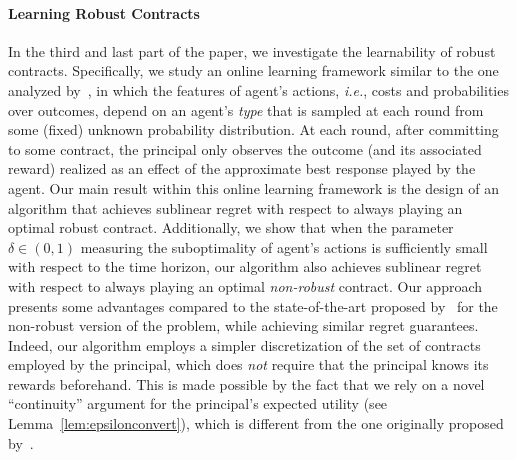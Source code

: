\paragraph{Learning Robust Contracts} 
%
In the third and last part of the paper, we investigate the learnability of robust contracts.
%
Specifically, we study an online learning framework similar to the one analyzed by~\citet{Zhu2023Sample}, in which the features of agent's actions, \emph{i.e.}, costs and probabilities over outcomes, depend on an agent's \emph{type} that is sampled at each round from some (fixed) unknown probability distribution.
%
%
%
At each round, after committing to some contract, the principal only observes the outcome (and its associated reward) realized as an effect of the approximate best response played by the agent.
%
Our main result within this online learning framework is the design of an algorithm that achieves sublinear regret with respect to always playing an optimal robust contract.
%
Additionally, we show that when the parameter $\delta \in (0,1)$ measuring the suboptimality of agent's actions is sufficiently small with respect to the time horizon, our algorithm also achieves sublinear regret with respect to always playing an optimal \emph{non-robust} contract. 
%
Our approach presents some advantages compared to the state-of-the-art proposed by~\citet{Zhu2023Sample} for the non-robust version of the problem, while achieving similar regret guarantees.
%
Indeed, our algorithm employs a simpler discretization of the set of contracts employed by the principal, which does \emph{not} require that the principal knows its rewards beforehand.
%
This is made possible by the fact that we rely on a novel ``continuity'' argument for the principal’s expected utility (see Lemma~\ref{lem:epsilonconvert}),  which is different from the one originally proposed by~\citet{Zhu2023Sample}.






